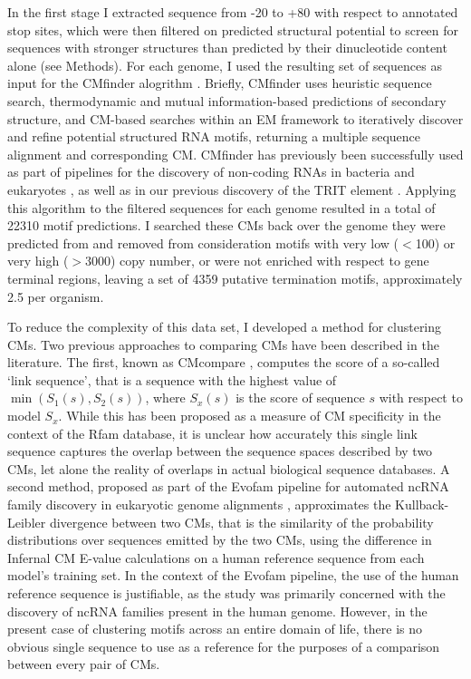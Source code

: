 In the first stage I extracted sequence from -20 to +80 with respect to annotated stop sites, which were then filtered on predicted structural potential to screen for sequences with stronger structures than predicted by their dinucleotide content alone (see Methods). For each genome, I used the resulting set of sequences as input for the CMfinder alogrithm \parencite{Yao2006}. Briefly, CMfinder uses heuristic sequence search, thermodynamic and mutual information-based predictions of secondary structure, and CM-based searches within an EM framework to iteratively discover and refine potential structured RNA motifs, returning a multiple sequence alignment and corresponding CM. CMfinder has previously been successfully used as part of pipelines for the discovery of non-coding RNAs in bacteria \parencite{Weinberg2007, Weinberg2010} and eukaryotes \parencite{Torarinsson2008a}, as well as in our previous discovery of the TRIT element \parencite{Gardner2011a}. Applying this algorithm to the filtered sequences for each genome resulted in a total of 22310 motif predictions. I searched these CMs back over the genome they were predicted from and removed from consideration motifs with very low ($<$100) or very high ($>3000$) copy number, or were not enriched with respect to gene terminal regions, leaving a set of 4359 putative termination motifs, approximately 2.5 per organism.

To reduce the complexity of this data set, I developed a method for clustering CMs. Two previous approaches to comparing CMs have been described in the literature. The first, known as CMcompare \parencite{Honer-zu-Siederdissen2010}, computes the score of a so-called `link sequence', that is a sequence with the highest value of $\min{(S_1(s), S_2(s))}$, where $S_x(s)$ is the score of sequence $s$ with respect to model $S_x$. While this has been proposed as a measure of CM specificity in the context of the Rfam database, it is unclear how accurately this single link sequence captures the overlap between the sequence spaces described by two CMs, let alone the reality of overlaps in actual biological sequence databases. A second method, proposed as part of the Evofam pipeline for automated ncRNA family discovery in eukaryotic genome alignments \parencite{Parker2011}, approximates the Kullback-Leibler divergence between two CMs, that is the similarity of the probability distributions over sequences emitted by the two CMs, using the difference in Infernal CM E-value calculations on a human reference sequence from each model's training set. In the context of the Evofam pipeline, the use of the human reference sequence is justifiable, as the study was primarily concerned with the discovery of ncRNA families present in the human genome. However, in the present case of clustering motifs across an entire domain of life, there is no obvious single sequence to use as a reference for the purposes of a comparison between every pair of CMs.


